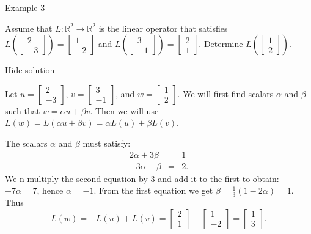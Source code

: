 Example 3

Assume that \( L:\mathbb R^2\to\mathbb R^2 \) is the linear operator that satisfies \( L\left(\left[\begin{array}{c}2\\-3\end{array}\right]\right)=\left[\begin{array}{c}1\\-2\end{array}\right]\) and \( L\left(\left[\begin{array}{c}3\\-1\end{array}\right]\right)=\left[\begin{array}{c}2\\1\end{array}\right]\). Determine \( L\left(\left[\begin{array}{c}1\\2\end{array}\right]\right)\).

Hide solution

Let \( u=\left[\begin{array}{c}2\\-3\end{array}\right]\), \( v=\left[\begin{array}{c}3\\-1\end{array}\right]\), and \( w=\left[\begin{array}{c}1\\2\end{array}\right]\). We will first find scalars \( \alpha \) and \( \beta \) such that \( w=\alpha u+\beta v \). Then we will use \( L(w)=L(\alpha u+\beta v)=\alpha L(u)+\beta L(v) \).

The scalars \( \alpha \) and \( \beta \) must satisfy: \begin{eqnarray*} 2\alpha+3\beta&=&1\\ -3\alpha-\beta&=&2. \end{eqnarray*} We n multiply the second equation by \( 3 \) and add it to the first to obtain: \( -7\alpha=7 \), hence \( \alpha=-1 \). From the first equation we get \( \beta=\frac13(1-2\alpha)=1 \). Thus \[L(w)=-L(u)+L(v)=\left[\begin{array}{c}2\\1\end{array}\right] - \left[\begin{array}{c}1\\-2\end{array}\right]=\left[\begin{array}{c}1\\3\end{array}\right].\]

